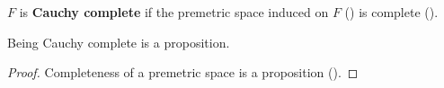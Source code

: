 \begin{definition}
  \label{IsCauchyComplete}
  $F$ is \textbf{Cauchy complete} if the premetric space induced on $F$ () is complete ().
\end{definition}

\begin{lemma}
  \label{isPropIsCauchyComplete}
  Being Cauchy complete is a proposition.
\end{lemma}
\begin{proof}
  Completeness of a premetric space is a proposition ().
\end{proof}
